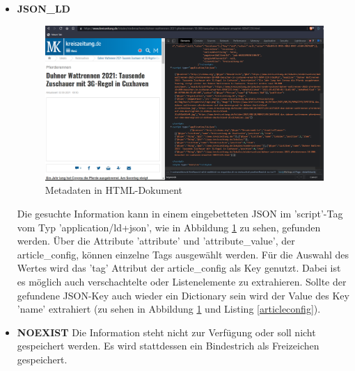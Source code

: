 \documentclass[12pt,oneside,a4paper,parskip]{scrbook}
\begin{document}
\begin{itemize}
\pagebreak

\item \textbf{JSON\_LD}\newline
\begin{figure}[h!]
\caption{Metadaten in HTML-Dokument}
\label{articlejson}
\centering
\includegraphics[scale=0.4]{articles_ld_json.png}
\end{figure} \newline
 Die gesuchte Information kann in einem eingebetteten JSON im 'script'-Tag vom Typ 'application/ld+json', wie in Abbildung \ref{articlejson} zu sehen, gefunden werden. Über die Attribute 'attribute' und 'attribute\_value', der article\_config, können einzelne Tags ausgewählt werden. Für die Auswahl des Wertes wird das 'tag' Attribut der article\_config als Key genutzt. Dabei ist es möglich auch verschachtelte oder Listenelemente zu extrahieren. Sollte der gefundene JSON-Key auch wieder ein Dictionary sein wird der Value des Key 'name' extrahiert (zu sehen in Abbildung \ref{articlejson} und Listing \ref{articleconfig}). 

\item \textbf{NOEXIST} \newline
Die Information steht nicht zur Verfügung oder soll nicht gespeichert werden. Es wird stattdessen ein Bindestrich als Freizeichen gespeichert.
\end{itemize}

\pagebreak
\end{document}
